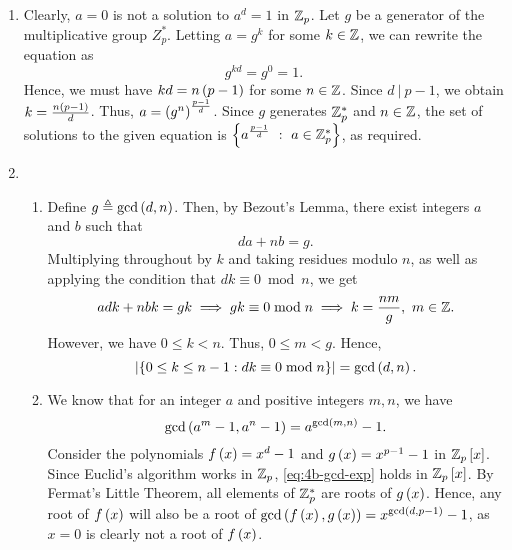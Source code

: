 \documentclass[journal,12pt,onecolumn]{IEEEtran}
\begin{document}
\begin{enumerate}
    \item Clearly, \(a = 0\) is not a solution to \(a^d = 1\) in \(\mathbb Z_p\). Let
    \(g\) be a generator of the multiplicative group \(Z_p^*\). Letting \(a =
    g^k\) for some \(k \in \mathbb Z\), we can rewrite the equation as
    \begin{equation}
        g^{kd} = g^0 = 1.
        \label{eq:3-new-eq}
    \end{equation}
    Hence, we must have \(kd = n\left(p-1\right)\) for some \(n\in\mathbb Z\). Since \(d\ |\
    p-1\), we obtain \(k = \frac{n\left(p-1\right)}{d}\). Thus, \(a =
    \left(g^n\right)^{\frac{p-1}{d}}\). Since \(g\) generates \(\mathbb Z_p^*\) and
    \(n\in\mathbb Z\), the set of solutions to the given equation is
    \(\left\{a^{\frac{p-1}{d}}\ :\ a \in \mathbb Z_p^*\right\}\), as required.

    \item 
    \begin{enumerate}
        \item Define \(g \triangleq \gcd\left(d,n\right)\). Then, by Bezout's Lemma,
        there exist integers \(a\) and \(b\) such that
        \begin{equation}
            da + nb = g.
            \label{eq:4a-gcd}
        \end{equation}
        Multiplying throughout by \(k\) and taking residues modulo \(n\), as
        well as applying the condition that \(dk \equiv 0 \bmod n\), we get
        \begin{equation}
            adk + nbk = gk \implies gk \equiv 0 \bmod n \implies k = \frac{nm}{g},\ m \in \mathbb Z.
            \label{eq:4a-k-sol}
        \end{equation}
        However, we have \(0 \le k < n\). Thus, \(0 \le m < g\). Hence,
        \begin{equation}
            \left\vert\left\{0 \le k \le n - 1 : dk \equiv 0 \bmod n\right\}\right\vert = \gcd\left(d,n\right).
            \label{eq:4a-sol}
        \end{equation}

        \item We know that for an integer \(a\) and positive integers \(m,n\),
        we have
        \begin{equation}
            \gcd\left(a^m-1,a^n-1\right) = a^{\gcd\left(m,n\right)}-1.
            \label{eq:4b-gcd-exp}
        \end{equation}
        Consider the polynomials \(f\left(x\right) = x^d - 1\) and \(g\left(x\right) =
        x^{p-1} - 1\) in \(\mathbb Z_p{}\left[x\right]\). Since Euclid's algorithm works in
        \(\mathbb Z_p\), \eqref{eq:4b-gcd-exp} holds in \(\mathbb Z_p{}\left[x\right]\). By
        Fermat's Little Theorem, all elements of \(\mathbb Z_p^*\) are roots of
        \(g\left(x\right)\). Hence, any root of \(f\left(x\right)\) will also be a root of
        \(\gcd\left(f\left(x\right),g\left(x\right)\right) = x^{\gcd\left(d,p-1\right)} - 1\), as \(x =
        0\) is clearly not a root of \(f\left(x\right)\).
        

\end{enumerate}
\end{enumerate}
\end{document}
